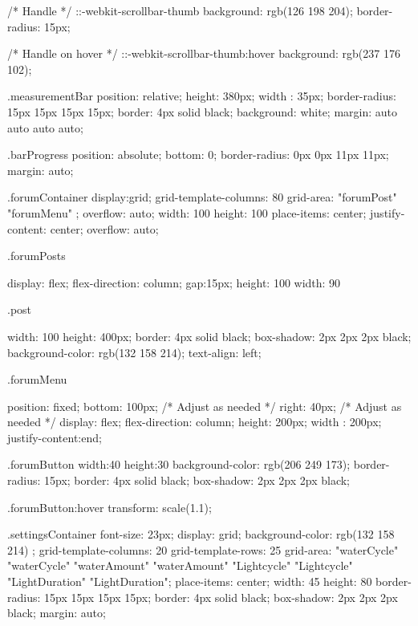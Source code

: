 \documentclass[12pt]{article} %
\begin{document}
\begin{htmlcode}[caption={CSS Stlye Sheet}]
     /* Handle */
     ::-webkit-scrollbar-thumb {
       background: rgb(126 198 204);
       border-radius: 15px;
    }
     
     /* Handle on hover */
     ::-webkit-scrollbar-thumb:hover {
       background: rgb(237 176 102);
     }
    
    .measurementBar
    {
       position: relative;
       height: 380px;
       width : 35px;
       border-radius: 15px 15px 15px 15px;
       border: 4px solid black;
       background: white;
       margin: auto auto auto auto;
    }
    
    .barProgress {
       position: absolute; 
       bottom: 0; 
       border-radius: 0px 0px 11px 11px; 
       margin: auto; 
    }
    
    
    .forumContainer
    {
       display:grid;
       grid-template-columns: 80%
       grid-area: 
       "forumPost" "forumMenu" ;
       overflow: auto;
       width: 100%
       height: 100%
       place-items: center;
       justify-content: center;
       overflow: auto;
    }
    
    .forumPosts
    {
       display: flex;
       flex-direction: column;
       gap:15px;
       height: 100%
       width: 90%
      
    }
    
    .post
    {
    
       width: 100%
       height: 400px;
       border: 4px solid black;
       box-shadow:  2px 2px 2px black;
       background-color: rgb(132 158 214);
       text-align: left;
    }
    
    .forumMenu
    { 
       position: fixed;
       bottom: 100px; /* Adjust as needed */
       right: 40px; /* Adjust as needed */
       display: flex;
       flex-direction: column;
       height: 200px;
       width : 200px;
       justify-content:end;
    
    
    }
    
    .forumButton
    {
       width:40%
       height:30%
       background-color: rgb(206 249 173);
       border-radius: 15px;
       border: 4px solid black;
       box-shadow:  2px 2px 2px black;
    }
    
    .forumButton:hover
    {
       transform: scale(1.1);
    }
    
    
    .settingsContainer
    {
       font-size: 23px;
       display: grid;
       background-color: rgb(132 158 214) ;
       grid-template-columns: 20%
       grid-template-rows: 25%
       grid-area: 
       "waterCycle" "waterCycle"
       "waterAmount" "waterAmount"
       "Lightcycle" "Lightcycle"
       "LightDuration" "LightDuration";
       place-items: center;
       width: 45%
       height: 80%
       border-radius: 15px 15px 15px 15px;
       border: 4px solid black;
       box-shadow:  2px 2px 2px black;
       margin: auto;
    }
    

\end{htmlcode}
\end{document}
